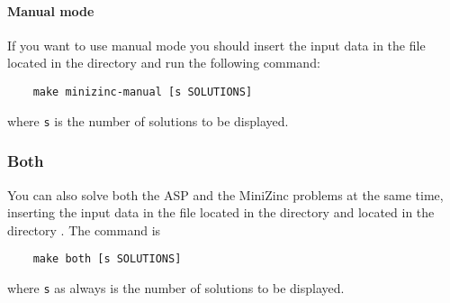 \paragraph{Manual mode}

If you want to use manual mode you should insert the input data in the file  located in the directory  and run the following command:
\begin{verbatim}
    make minizinc-manual [s SOLUTIONS]
\end{verbatim}
where \texttt{s} is the number of solutions to be displayed.

\subsubsection{Both}
You can also solve both the ASP and the MiniZinc problems at the same time, inserting the input data in the file  located in the directory  and  located in the directory . The command is
\begin{verbatim}
    make both [s SOLUTIONS]
\end{verbatim}
where \texttt{s} as always is the number of solutions to be displayed.